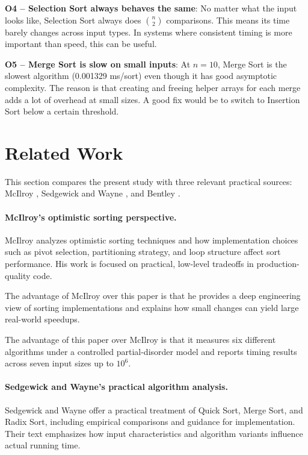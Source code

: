 \documentclass[12pt,a4paper]{article}
\theoremstyle{definition}
\begin{document}
\textbf{O4 -- Selection Sort always behaves the same}: No matter what the input looks like, Selection Sort always does $\binom{n}{2}$ comparisons. This means its time barely changes across input types. In systems where consistent timing is more important than speed, this can be useful.

\textbf{O5 -- Merge Sort is slow on small inputs}: At $n=10$, Merge Sort is the slowest algorithm (0.001329 ms/sort) even though it has good asymptotic complexity. The reason is that creating and freeing helper arrays for each merge adds a lot of overhead at small sizes. A good fix would be to switch to Insertion Sort below a certain threshold.

\section{Related Work}
\label{sec:related}

This section compares the present study with three relevant practical sources: McIlroy \cite{mcilroy1993}, Sedgewick and Wayne \cite{sedgewick2011}, and Bentley \cite{bentley1999}.

\paragraph{McIlroy's optimistic sorting perspective.}
McIlroy \cite{mcilroy1993} analyzes optimistic sorting techniques and how implementation choices such as pivot selection, partitioning strategy, and loop structure affect sort performance. His work is focused on practical, low-level tradeoffs in production-quality code.

The advantage of McIlroy over this paper is that he provides a deep engineering view of sorting implementations and explains how small changes can yield large real-world speedups.

The advantage of this paper over McIlroy is that it measures six different algorithms under a controlled partial-disorder model and reports timing results across seven input sizes up to $10^6$.

\paragraph{Sedgewick and Wayne's practical algorithm analysis.}
Sedgewick and Wayne \cite{sedgewick2011} offer a practical treatment of Quick Sort, Merge Sort, and Radix Sort, including empirical comparisons and guidance for implementation. Their text emphasizes how input characteristics and algorithm variants influence actual running time.
\end{document}
